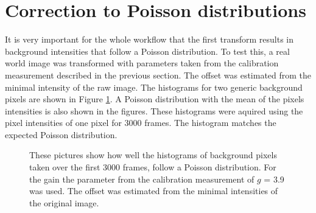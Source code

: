 \section{Correction to Poisson distributions}
It is very important for the whole workflow that the first transform results in background intensities that follow a Poisson distribution. To test this, a real world image was transformed with parameters taken from the calibration measurement described in the previous section. The offset was estimated from the minimal intensity of the raw image. The histograms for two generic background pixels are shown in Figure \ref{isitPoisson}. A Poisson distribution with the mean of the pixels intensities is also shown in the figures. These histograms were aquired using the pixel intensities of one pixel for 3000 frames. The histogram matches the expected Poisson distribution.
\begin{figure}
\hfill
{}
	\caption{These pictures show how well the histograms of background pixels taken over the first 3000 frames, follow a Poisson distribution. For the gain the parameter from the calibration measurement of $g$ = 3.9 was used. The offset was estimated from the minimal intensities of the original image.}
	\label{isitPoisson}	
\end{figure}

